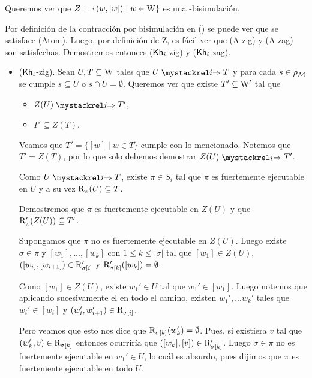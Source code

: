 \begin{demostracion}
    Queremos ver que $Z = \{(w,[w]) \mid w \in \mathrm{W}\}$ es una \KHilogic-bisimulación.
    
    Por definición de la contracción por bisimulación en (\bml) se puede ver que se satisface (Atom). Luego, por definición de Z, es fácil ver que (A-zig) y (A-zag) son satisfechas. Demostremos entonces ($\mathsf{Kh}_i$-zig) y ($\mathsf{Kh}_i$-zag).

    \begin{itemize}
        \item ($\mathsf{Kh}_i$-zig). Sean $U, T \subseteq \mathrm{W}$ tales que $U \ultsExecAgi T$ y para cada $s \in \rho_{\mathcal{M}}$ se cumple $s \subseteq U$ o 
        $s \cap U = \emptyset$. Queremos ver que existe $T' \subseteq \mathrm{W}'$ tal que

        \begin{multicols}{2}
            \begin{itemize}
                \item $Z(U) \ultsExecAgi T'$, 
                \item $T' \subseteq Z(T)$.
            \end{itemize}
        \end{multicols}
        Veamos que $T' = \{[w] \mid w \in T\}$ cumple con lo mencionado. Notemos que $T' = Z(T)$, por lo que solo debemos demostrar 
        $Z(U) \ultsExecAgi T'$.

        Como $U \ultsExecAgi T$, existe $\pi \in S_i$ tal que $\pi$ es fuertemente ejecutable en $U$ y a su vez $\mathrm{R}_\pi(U) \subseteq T$.

        Demostremos que $\pi$ es fuertemente ejecutable en $Z(U)$ y que $\mathrm{R}'_\pi(Z(U)) \subseteq T'$.

        Supongamos que $\pi$ no es fuertemente ejecutable en $Z(U)$. Luego existe $\sigma \in \pi$ y $[w_1],...,[w_k]$ 
        con $1 \le k \le |\sigma|$ tal que $[w_1] \in Z(U)$, $([w_i], [w_{i+1}]) \in \mathrm{R}'_{\sigma[i]}$ y 
        $\mathrm{R}'_{\sigma[k]}([w_k]) = \emptyset$.

        Como $[w_1] \in Z(U)$, existe $w_1' \in U$ tal que $w_1' \in [w_1]$. Luego notemos que aplicando sucesivamente el  
        en todo el camino, existen $w_1',...w_k'$ tales que $w_i' \in [w_i]$ y $(w_i',w_{i+1}') \in \mathrm{R}_{\sigma[i]}$.

        Pero veamos que esto nos dice que $\mathrm{R}_{\sigma[k]}(w_k') = \emptyset$. Pues, si existiera $v$ tal que 
        $(w_k',v) \in \mathrm{R}_{\sigma[k]}$ entonces ocurriría que $([w_k],[v]) \in \mathrm{R}'_{\sigma[k]}$. Luego $\sigma \in \pi$ no es 
        fuertemente ejecutable en $w_1' \in U$, lo cuál es absurdo, pues dijimos que $\pi$ es fuertemente ejecutable en todo $U$.


\end{itemize}
\end{demostracion}
